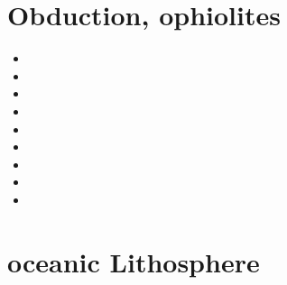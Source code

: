 \newpage
\section{Obduction, ophiolites}

\begin{small}
\begin{itemize}
\item[\nineteenninety] 
\item[\nineteenninetyone] 
\item[\nineteenninetyseven] 
\item[\twothousand] 
\item[\twothousandfourteen] 
\item[\twothousandsixteen] 
\item[\twothousandtwenty] 
\item[\twothousandtwentyone] 
\item[\twothousandtwentytwo] 
\end{itemize}
\end{small}

\section{oceanic Lithosphere}


